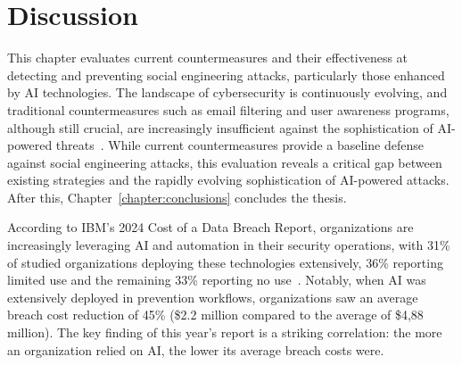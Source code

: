 


\chapter{Discussion\label{chapter:discussion}}
\begin{comment}

    - OpenAI attempts to control how ChatGPT etc are used
    - Efficacy of EU and other level regulations
    - Instagram flagging content that might've been generated with AI (this is futile in the future?)

\end{comment}

This chapter evaluates current countermeasures and their effectiveness at detecting and preventing social engineering attacks, particularly those enhanced by AI technologies. The landscape of cybersecurity is continuously evolving, and traditional countermeasures such as email filtering and user awareness programs, although still crucial, are increasingly insufficient against the sophistication of AI-powered threats~\citep{fakhouri_AI_Driven_Solutions_SE_Attacks_2024}. While current countermeasures provide a baseline defense against social engineering attacks, this evaluation reveals a critical gap between existing strategies and the rapidly evolving sophistication of AI-powered attacks. After this, Chapter~\ref{chapter:conclusions} concludes the thesis.






According to IBM's 2024 Cost of a Data Breach Report, organizations are increasingly leveraging AI and automation in their security operations, with 31\% of studied organizations deploying these technologies extensively, 36\% reporting limited use and the remaining 33\% reporting no use~\citep{ibm_Cost_Data_Breach_Report_2024}. Notably, when AI was extensively deployed in prevention workflows, organizations saw an average breach cost reduction of 45\% (\$2.2 million compared to the average of \$4,88 million). The key finding of this year's report is a striking correlation: the more an organization relied on AI, the lower its average breach costs were.







